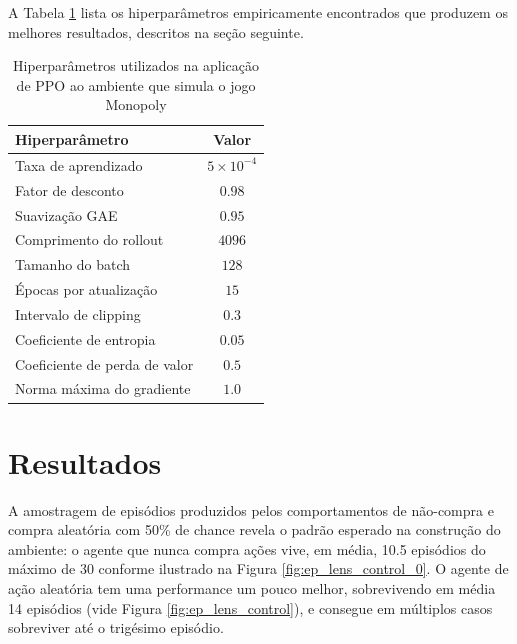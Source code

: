 \documentclass[conference]{IEEEtran}
\begin{document}
A Tabela \ref{tab:ppo_hyperparams} lista os hiperparâmetros empiricamente encontrados que produzem os melhores resultados, descritos na seção seguinte.

\begin{table}[h!]
\caption{Hiperparâmetros utilizados na aplicação de PPO ao ambiente que simula o jogo Monopoly}
\begin{center}
\begin{tabular}{|l|c|}
\hline
\textbf{Hiperparâmetro}              & \textbf{Valor}    \\
\hline
Taxa de aprendizado                  & $5\times10^{-4}$  \\
\hline
Fator de desconto                    & $0.98$            \\
\hline
Suavização GAE                       & $0.95$            \\
\hline
Comprimento do rollout               & $4096$            \\
\hline
Tamanho do batch                     & $128$             \\
\hline
Épocas por atualização               & $15$              \\
\hline
Intervalo de clipping                & $0.3$             \\
\hline
Coeficiente de entropia              & $0.05$            \\
\hline
Coeficiente de perda de valor        & $0.5$             \\
\hline
Norma máxima do gradiente            & $1.0$             \\
\hline
\end{tabular}
\label{tab:ppo_hyperparams}
\end{center}
\end{table}


\section{Resultados}
\label{results}
A amostragem de episódios produzidos pelos comportamentos de não-compra e compra aleatória com 50\% de chance revela o padrão esperado na construção do ambiente: o agente que nunca compra ações vive, em média, 10.5 episódios do máximo de 30 conforme ilustrado na Figura \ref{fig:ep_lens_control_0}. O agente de ação aleatória tem uma performance um pouco melhor, sobrevivendo em média 14 episódios (vide Figura \ref{fig:ep_lens_control}), e consegue em múltiplos casos sobreviver até o trigésimo episódio. 
\end{document}
